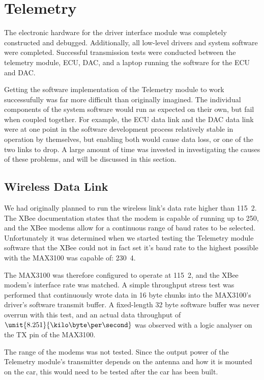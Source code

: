 \section{Telemetry}

The electronic hardware for the driver interface module was completely constructed and debugged. Additionally, all low-level drivers and system software were completed. Successful transmission tests were conducted between the telemetry module, ECU, DAC, and a laptop running the software for the ECU and DAC.

Getting the software implementation of the Telemetry module to work successufully was far more difficult than originally imagined. The individual components of the system software would run as expected on their own, but fail when coupled together. For example, the ECU data link and the DAC data link were at one point in the software development process relatively stable in operation by themselves, but enabling both would cause data loss, or one of the two links to drop. A large amount of time was invested in investigating the causes of these problems, and will be discussed in this section.

\subsection{Wireless Data Link}

We had originally planned to run the wireless link's data rate higher than \unit{115.2}{\kilo\bit\per\second}. The XBee documentation states that the modem is capable of running up to \unit{250}{\kilo\bit\per\second}, and the XBee modems allow for a continuous range of baud rates to be selected. Unfortunately it was determined when we started testing the Telemetry module software that the XBee could not in fact set it's baud rate to the highest possible with the MAX3100 was capable of: \unit{230.4}{\kilo\bit\per\second}.

The MAX3100 was therefore configured to operate at \unit{115.2}{\kilo\bit\per\second}, and the XBee modem's interface rate was matched. A simple throughput stress test was performed that continuously wrote data in 16 byte chunks into the MAX3100's driver's software transmit buffer. A fixed-length 32 byte software buffer was never overrun with this test, and an actual data throughput of $\unit{8.251}{\kilo\byte\per\second}$ was observed with a logic analyser on the TX pin of the MAX3100.

The range of the modems was not tested. Since the output power of the Telemetry module's transmitter depends on the antenna and how it is mounted on the car, this would need to be tested after the car has been built.

